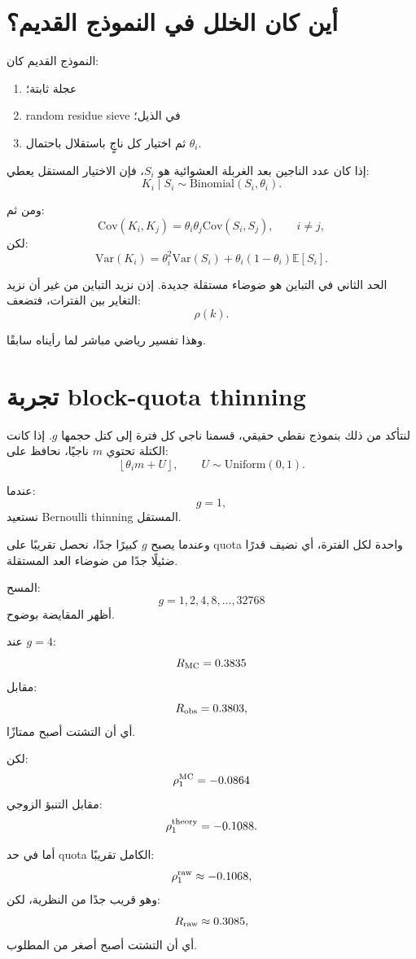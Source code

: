 \documentclass[12pt]{article}
\begin{document}
\section{أين كان الخلل في النموذج القديم؟}

النموذج القديم كان:

\begin{enumerate}
\item عجلة ثابتة؛
\item random residue sieve في الذيل؛
\item ثم اختيار كل ناجٍ باستقلال باحتمال \(\theta_i\).
\end{enumerate}

إذا كان عدد الناجين بعد الغربلة العشوائية هو \(S_i\)، فإن الاختيار المستقل يعطي:
\[
K_i\mid S_i
\sim
\mathrm{Binomial}(S_i,\theta_i).
\]

ومن ثم:
\[
\mathrm{Cov}(K_i,K_j)
=
\theta_i\theta_j\mathrm{Cov}(S_i,S_j),
\qquad i\ne j,
\]
لكن:
\[
\mathrm{Var}(K_i)
=
\theta_i^2\mathrm{Var}(S_i)
+
\theta_i(1-\theta_i)\mathbb E[S_i].
\]

الحد الثاني في التباين هو ضوضاء مستقلة جديدة.
إذن نزيد التباين من غير أن نزيد التغاير بين الفترات، فتضعف:
\[
\rho(k).
\]

وهذا تفسير رياضي مباشر لما رأيناه سابقًا.

\section{تجربة block-quota thinning}

لنتأكد من ذلك بنموذج نقطي حقيقي، قسمنا ناجي كل فترة إلى كتل حجمها \(g\).
إذا كانت الكتلة تحتوي \(m\) ناجيًا، نحافظ على:
\[
\left\lfloor \theta_i m+U\right\rfloor,
\qquad U\sim\mathrm{Uniform}(0,1).
\]

عندما:
\[
g=1,
\]
نستعيد Bernoulli thinning المستقل.

وعندما يصبح \(g\) كبيرًا جدًا، نحصل تقريبًا على quota واحدة لكل الفترة،
أي نضيف قدرًا ضئيلًا جدًا من ضوضاء العد المستقلة.

المسح:
\[
g=1,2,4,8,\ldots,32768
\]
أظهر المقايضة بوضوح.

عند \(g=4\):
\[
R_{\rm MC}=0.3835
\]
مقابل:
\[
R_{\rm obs}=0.3803,
\]
أي أن التشتت أصبح ممتازًا.

لكن:
\[
\rho_1^{\rm MC}=-0.0864
\]
مقابل التنبؤ الزوجي:
\[
\rho_1^{\rm theory}=-0.1088.
\]

أما في حد quota الكامل تقريبًا:
\[
\rho_1^{\rm raw}\approx-0.1068,
\]
وهو قريب جدًا من النظرية، لكن:
\[
R_{\rm raw}\approx0.3085,
\]
أي أن التشتت أصبح أصغر من المطلوب.
\end{document}
